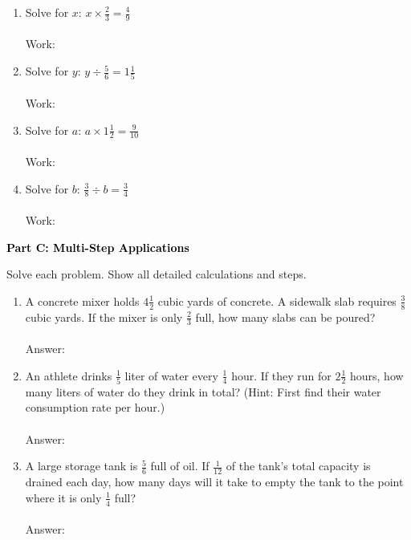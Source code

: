 \documentclass[12pt, letterpaper, fleqn]{article}
\newcommand{\blanklong}{\underline{\hspace{6.5cm}}}
\begin{document}
\vspace{5mm}
\begin{enumerate}[itemsep=2.5cm, leftmargin=0.6cm]
\item Solve for $x$: $x \times \frac{2}{3} = \frac{4}{9}$ \\ \\
Work: 

\item Solve for $y$: $y \div \frac{5}{6} = 1\frac{1}{5}$ \\ \\
Work: 

\item Solve for $a$: $a \times 1\frac{1}{2} = \frac{9}{10}$ \\ \\ 
Work: 

\item Solve for $b$: $\frac{3}{8} \div b = \frac{3}{4}$ \\ \\
Work: 
\end{enumerate}
\newpage

\begin{tcolorbox}[colback=black!10]
    \large\textcolor{black}{\textbf{Part C: Multi-Step Applications}}
\end{tcolorbox}

\vspace{3mm}
\noindent
Solve each problem. Show all detailed calculations and steps.

\vspace{5mm}
\begin{enumerate}[itemsep=2.2cm, leftmargin=0.6cm]
\item A concrete mixer holds $4\frac{1}{2}$ cubic yards of concrete. A sidewalk slab requires $\frac{3}{8}$ cubic yards. If the mixer is only $\frac{2}{3}$ full, how many slabs can be poured? \\ \\
Answer: \blanklong
\vspace{1cm}
\item An athlete drinks $\frac{1}{5}$ liter of water every $\frac{1}{4}$ hour. If they run for $2\frac{1}{2}$ hours, how many liters of water do they drink in total? (Hint: First find their water consumption rate per hour.) \\ \\
Answer: \blanklong
\vspace{1cm}
\item A large storage tank is $\frac{5}{6}$ full of oil. If $\frac{1}{12}$ of the tank's total capacity is drained each day, how many days will it take to empty the tank to the point where it is only $\frac{1}{4}$ full? \\ \\
Answer: \blanklong
\vspace{1cm}
\end{enumerate}
\newpage
\end{document}
